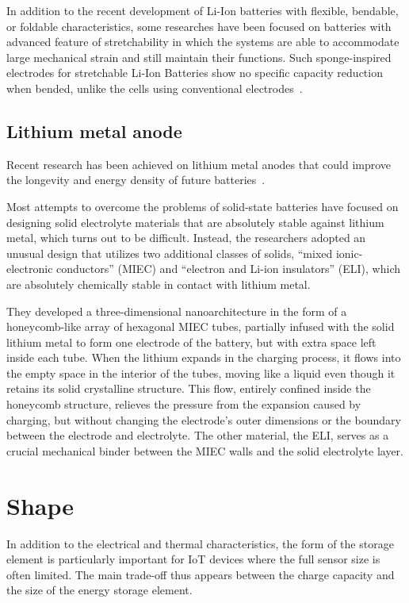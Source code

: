 \documentclass{EPL-master-thesis-covers-EN}
\begin{document}
In addition to the recent development of Li-Ion batteries with  flexible, bendable, or foldable characteristics, some researches have been focused on batteries with advanced feature of stretchability in which the systems are able to accommodate large mechanical strain and still maintain their functions. Such sponge-inspired electrodes for stretchable Li-Ion Batteries show no specific capacity reduction when bended, unlike the cells using conventional electrodes~\cite{doi:10.1002/adma.201505299}.

\subsection*{Lithium metal anode}

Recent research has been achieved on lithium metal anodes that could improve the longevity and energy density of future batteries~\cite{10.1038/s41586-020-1972-y}.

Most attempts to overcome the problems of solid-state batteries have focused on designing solid electrolyte materials that are absolutely stable against lithium metal, which turns out to be difficult.  Instead, the researchers adopted an unusual design that utilizes two additional classes of solids, “mixed ionic-electronic conductors” (MIEC) and “electron and Li-ion insulators” (ELI), which are absolutely chemically stable in contact with lithium metal. 

They developed a three-dimensional nanoarchitecture in the form of a honeycomb-like array of hexagonal MIEC tubes, partially infused with the solid lithium metal to form one electrode of the battery, but with extra space left inside each tube. When the lithium expands in the charging process, it flows into the empty space in the interior of the tubes, moving like a liquid even though it retains its solid crystalline structure. This flow, entirely confined inside the honeycomb structure, relieves the pressure from the expansion caused by charging, but without changing the electrode’s outer dimensions or the boundary between the electrode and electrolyte. The other material, the ELI, serves as a crucial mechanical binder between the MIEC walls and the solid electrolyte layer.

\section{Shape}

In addition to the electrical and thermal characteristics, the form of the storage element is particularly important for IoT devices where the full sensor size is often limited. The main trade-off thus appears between the charge capacity and the size of the energy storage element.
\end{document}
